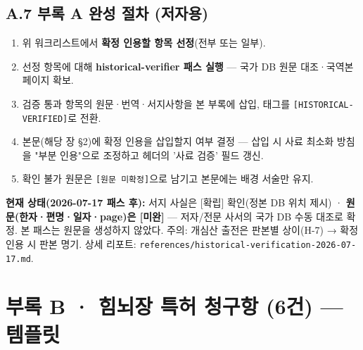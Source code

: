 \documentclass[12pt,oneside]{book}
\newenvironment{authnote}
  {\par\smallskip\begingroup\leftskip=6mm\rightskip=3mm\small\color{muted}\noindent\ignorespaces}
  {\par\endgroup\smallskip}
\begin{document}
\vspace{2pt}\vspace{3pt}

\section{A.7 부록 A 완성 절차 (저자용)}

\begin{enumerate}[leftmargin=6mm,itemsep=1pt,topsep=2pt]
  \item 위 워크리스트에서 \textbf{확정 인용할 항목 선정}(전부 또는 일부).
  \item 선정 항목에 대해 \textbf{historical-verifier 패스 실행} — 국가 DB 원문 대조·국역본 페이지 확보.
  \item 검증 통과 항목의 원문·번역·서지사항을 본 부록에 삽입, 태그를 \texttt{[HISTORICAL-VERIFIED]}로 전환.
  \item 본문(해당 장 §2)에 확정 인용을 삽입할지 여부 결정 — 삽입 시 사료 최소화 방침을 "부분 인용"으로 조정하고 헤더의 '사료 검증' 필드 갱신.
  \item 확인 불가 원문은 \texttt{[원문 미확정]}으로 남기고 본문에는 배경 서술만 유지.
\end{enumerate}

\begin{authnote}\textbf{현재 상태(2026-07-17 패스 후):} 서지 사실은 [확립] 확인(정본 DB 위치 제시) · \textbf{원문(한자·편명·일자·page)은 [미완]} — 저자/전문 사서의 국가 DB 수동 대조로 확정. 본 패스는 원문을 생성하지 않았다. 주의: 개심산 출전은 판본별 상이(H-7) → 확정 인용 시 판본 명기. 상세 리포트: \texttt{references/historical-verification-2026-07-17.md}.\end{authnote}
\chapter*{부록 B · 힘뇌장 특허 청구항 (6건) — 템플릿}
\end{document}
